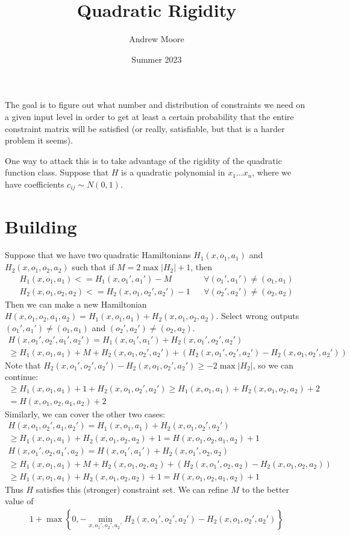 \documentclass{article}
\title{Quadratic Rigidity}
\author{Andrew Moore}
\date{Summer 2023}
\begin{document}
\maketitle

The goal is to figure out what number and distribution of constraints we need on a given input level in order to get at least a certain probability that the entire constraint matrix will be satisfied (or really, satisfiable, but that is a harder problem it seems). 

One way to attack this is to take advantage of the rigidity of the quadratic function class. Suppose that $H$ is a quadratic polynomial in $x_1 \dots x_n$, where we have coefficients $c_{ij} \sim N(0,1)$. 

\section{Building}

Suppose that we have two quadratic Hamiltonians $H_1(x, o_1, a_1)$ and $H_2(x, o_1, o_2, a_2)$ such that if $M = 2\max |H_2|+1$, then
\begin{align}
	H_1(x, o_1, a_1) <= H_1(x, o_1', a_1') - M &&\forall (o_1', a_1') \neq (o_1, a_1)\\
	H_2(x,o_1,o_2, a_2) <= H_2(x,o_1,o_2',a_2')-1 &&\forall (o_2', a_2') \neq (o_2, a_2)
\end{align}
Then we can make a new Hamiltonian $H(x,o_1,o_2,a_1,a_2) = H_1(x,o_1,a_1) + H_2(x,o_1,o_2,a_2)$. Select wrong outputs $(o_1', a_1') \neq (o_1,a_1)$ and $(o_2', a_2') \neq (o_2, a_2)$.
\begin{align}
	H(x,o_1',o_2',a_1',a_2') = H_1(x,o_1',a_1') + H_2(x,o_1',o_2',a_2') \\
	\geq H_1(x,o_1,a_1) + M + H_2(x,o_1,o_2',a_2') + (H_2(x,o_1', o_2', a_2') - H_2(x,o_1,o_2',a_2'))
\end{align}
Note that $H_2(x,o_1', o_2', a_2') - H_2(x,o_1,o_2',a_2') \geq -2\max|H_2|$, so we can continue:
\begin{align}
	\geq H_1(x,o_1,a_1) + 1 + H_2(x,o_1,o_2',a_2') \geq H_1(x,o_1,a_1) + H_2(x,o_1,o_2,a_2) + 2\\
	= H(x,o_1,o_2,a_1,a_2) + 2
\end{align}
Similarly, we can cover the other two cases:
\begin{align}
	H(x,o_1,o_2',a_1,a_2') = H_1(x,o_1,a_1) + H_2(x,o_1,o_2',a_2')\\
	\geq H_1(x,o_1,a_1) + H_2(x,o_1,o_2,a_2) + 1 = H(x,o_1,o_2,a_1,a_2) + 1\\
	H(x,o_1',o_2,a_1',a_2) = H(x,o_1',a_1') + H_2(x,o_1',o_2,a_2)\\
	\geq H_1(x,o_1,a_1) + M + H_2(x,o_1,o_2,a_2) + (H_2(x,o_1',o_2,a_2) - H_2(x,o_1,o_2,a_2))\\
	\geq  H_1(x,o_1,a_1) + H_2(x,o_1,o_2,a_2) + 1 = H(x,o_1,o_2,a_1,a_2) + 1
\end{align}
Thus $H$ satisfies this (stronger) constraint set. We can refine $M$ to the better value of 
\begin{align}
	1 + \max\left\{0, -\min_{x,o_1', o_2', a_2'} H_2(x,o_1',o_2',a_2') - H_2(x,o_1,o_2',a_2')\right\}
\end{align}
\end{document}
